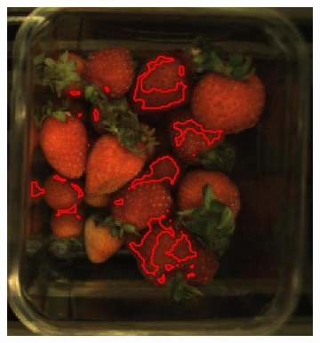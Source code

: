 \documentclass[fleqn,twoside,12pt]{report}
\begin{document}
\begin{figure}[ht]
\begin{subfigure}{.30\textwidth}
		\caption{}
		\label{fig:over_hue}
	\end{subfigure}%
	\begin{subfigure}{.30\textwidth}
		\centering
		\includegraphics[width=.9\linewidth]{over_diff_hue.jpg}
		\caption{}
		\label{fig:over_diff}
	\end{subfigure}%


\end{figure}
\end{document}
